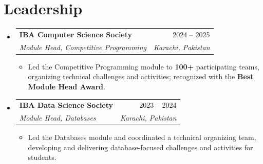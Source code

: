\documentclass[letterpaper,11pt]{article}
\makeatletter
\newlength{\entrygap}\setlength{\entrygap}{0.5pt}
\newcommand{\resumeItem}[1]{\item\small{#1}}
\newcommand{\resumeSubheading}[4]{
  \item
    \begin{tabular*}{\dimexpr\textwidth-0.15in\relax}[t]{l@{\extracolsep{\fill}}r}
      \textbf{\small #1} & \small #2 \\
      \textit{\small#3} & \textit{\small #4} \\
    \end{tabular*}
}
\newcommand{\resumeSubHeadingListStart}{\begin{itemize}[leftmargin=0.15in, label={}, topsep=0pt, partopsep=0pt, parsep=0pt, itemsep=\entrygap]}
\newcommand{\resumeSubHeadingListEnd}{\end{itemize}}
\newcommand{\resumeItemListStart}{\begin{itemize}[topsep=0pt, partopsep=0pt, parsep=0pt, itemsep=0pt]}
\newcommand{\resumeItemListEnd}{\end{itemize}}
\makeatother
\begin{document}
\section{Leadership}
  \resumeSubHeadingListStart
    \resumeSubheading
      {IBA Computer Science Society}{2024 -- 2025}
      {Module Head, Competitive Programming}{Karachi, Pakistan}
      \resumeItemListStart
        \resumeItem{Led the Competitive Programming module to \textbf{100+} participating teams, organizing technical challenges and activities; recognized with the \textbf{Best Module Head Award}.}
      \resumeItemListEnd
    \resumeSubheading
      {IBA Data Science Society}{2023 -- 2024}
      {Module Head, Databases}{Karachi, Pakistan}
      \resumeItemListStart
        \resumeItem{Led the Databases module and coordinated a technical organizing team, developing and delivering database-focused challenges and activities for students.}
      \resumeItemListEnd
  \resumeSubHeadingListEnd
\end{document}

